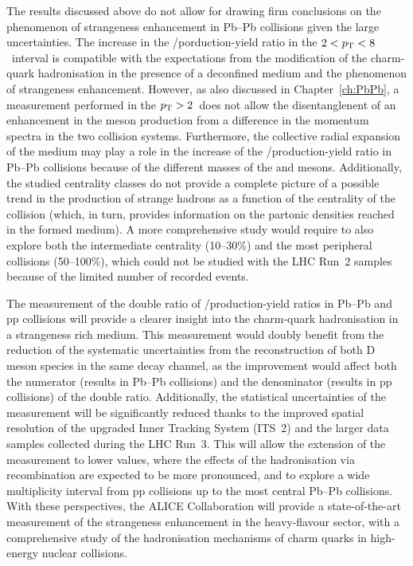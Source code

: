 The results discussed above do not allow for drawing firm conclusions on the phenomenon of strangeness enhancement in Pb--Pb collisions given the large uncertainties. The increase in the \ds/\dz porduction-yield ratio in the $2<p_\mathrm{T}<8$~\gevc interval is compatible with the expectations from the modification of the charm-quark hadronisation in the presence of a deconfined medium and the phenomenon of strangeness enhancement. However, as also discussed in Chapter~\ref{ch:PbPb}, a measurement performed in the $p_\mathrm{T}>2$~\gevc does not allow the disentanglenent of an enhancement in the \ds meson production from a difference in the momentum spectra in the two collision systems. Furthermore, the collective radial expansion of the medium may play a role in the increase of the \ds/\dz production-yield ratio in Pb--Pb collisions because of the different masses of the \ds and \dz mesons. Additionally, the studied centrality classes do not provide a complete picture of a possible trend in the production of strange hadrons as a function of the centrality of the collision (which, in turn, provides information on the partonic densities reached in the formed medium). A more comprehensive study would require to also explore both the intermediate centrality (10--30\%) and the most peripheral collisions (50--100\%), which could not be studied with the LHC Run~2 samples because of the limited number of recorded events.

The measurement of the double ratio of \ds/\dpl production-yield ratios in Pb--Pb and pp collisions will provide a clearer insight into the charm-quark hadronisation in a strangeness rich medium. This measurement would doubly benefit from the reduction of the systematic uncertainties from the reconstruction of both D meson species in the same decay channel, as the improvement would affect both the numerator (results in Pb--Pb collisions) and the denominator (results in pp collisions) of the double ratio. Additionally, the statistical uncertainties of the measurement will be significantly reduced thanks to the improved spatial resolution of the upgraded Inner Tracking System (ITS~2) and the larger data samples collected during the LHC Run~3. This will allow the extension of the measurement to lower \pt values, where the effects of the hadronisation via recombination are expected to be more pronounced, and to explore a wide multiplicity interval from pp collisions up to the most central Pb--Pb collisions. With these perspectives, the ALICE Collaboration will provide a state-of-the-art measurement of the strangeness enhancement in the heavy-flavour sector, with a comprehensive study of the hadronisation mechanisms of charm quarks in high-energy nuclear collisions.




